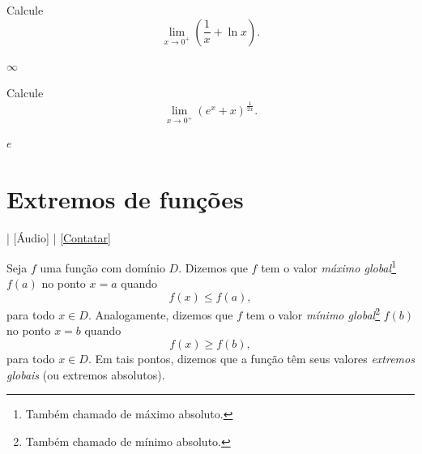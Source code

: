 \begin{exer}
  Calcule
  \begin{equation}
    \lim_{x\to 0^+} \left(\frac{1}{x}+\ln x\right).
  \end{equation}
\end{exer}
\begin{resp}
  $\infty$
\end{resp}

\begin{exer}
  Calcule
  \begin{equation}
    \lim_{x\to 0^+} \left(e^x + x\right)^{\frac{1}{2x}}.
  \end{equation}
\end{exer}
\begin{resp}
  $e$
\end{resp}

\section{Extremos de funções}\label{cap_apderiv_sec_extfun}

\begin{flushright}
  [Vídeo] | [Áudio] | \href{https://phkonzen.github.io/notas/contato.html}{[Contatar]}
\end{flushright}

Seja $f$ uma função com domínio $D$. Dizemos que $f$ tem o valor \emph{máximo global}\footnote{Também chamado de máximo absoluto.} $f(a)$ no ponto $x=a$ quando
\begin{equation}
  f(x) \leq f(a),
\end{equation}
para todo $x\in D$. Analogamente, dizemos que $f$ tem o valor \emph{mínimo global}\footnote{Também chamado de mínimo absoluto.} $f(b)$ no ponto $x=b$ quando
\begin{equation}
  f(x) \geq f(b),
\end{equation}
para todo $x\in D$. Em tais pontos, dizemos que a função têm seus valores \emph{extremos globais} (ou extremos absolutos).

